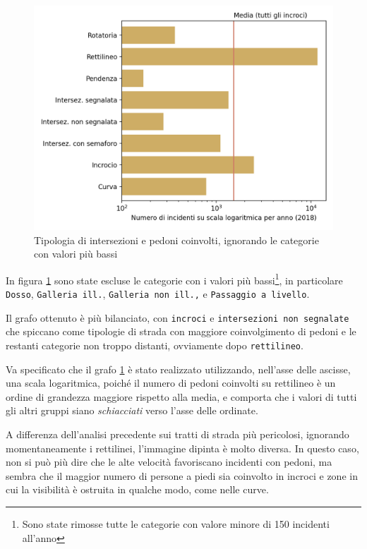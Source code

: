 \documentclass[a4paper,12pt]{report}
\newcommand{\columnstyle}[1]{\texttt{#1}}
\newcommand{\quotestyle}[1]{\textit{#1}}
\begin{document}
\begin{figure}
    \includegraphics[width=\linewidth]{../src/incidenti/incidenti_senza_coords/pedoni/pedoni_no_rett.png}
    \caption{Tipologia di intersezioni e pedoni coinvolti, ignorando le categorie con valori più bassi}
    \label{fig:pedoni-no-rett}
\end{figure}

In figura \ref{fig:pedoni-no-rett} sono state 
escluse le categorie con i valori 
più bassi\footnote{Sono state rimosse tutte le categorie con valore minore di 
150 incidenti all'anno}, 
in particolare \columnstyle{Dosso}, \columnstyle{Galleria ill.}, 
\columnstyle{Galleria non ill.,} e \columnstyle{Passaggio a livello}. 

Il grafo ottenuto è più bilanciato, con \columnstyle{incroci} e 
\columnstyle{intersezioni non segnalate} che spiccano come tipologie di strada con 
maggiore coinvolgimento di pedoni e le restanti categorie non troppo distanti, 
ovviamente dopo \columnstyle{rettilineo}.

Va specificato che il grafo \ref{fig:pedoni-no-rett} è stato realizzato utilizzando, 
nell'asse delle ascisse, una scala logaritmica, poiché il numero di pedoni coinvolti 
su rettilineo è un ordine di grandezza maggiore rispetto alla media, e 
comporta che i valori di tutti gli altri gruppi siano \quotestyle{schiacciati} 
verso l'asse delle ordinate.

A differenza dell'analisi precedente sui tratti di strada più pericolosi, 
ignorando momentaneamente i rettilinei, l'immagine dipinta è molto diversa.
In questo caso, non si può più dire che le alte velocità favoriscano incidenti con pedoni, 
ma sembra che il maggior numero di persone a piedi 
sia coinvolto in incroci e zone in cui la visibilità è ostruita in 
qualche modo, come nelle curve.
\end{document}
